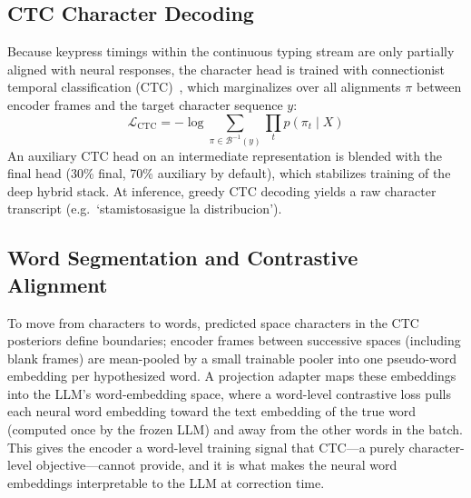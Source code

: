 \documentclass[conference]{IEEEtran}
\begin{document}
\subsection{CTC Character Decoding}
Because keypress timings within the continuous typing stream are only
partially aligned with neural responses, the character head is trained with
connectionist temporal classification (CTC)~\cite{graves2006ctc}, which
marginalizes over all alignments $\pi$ between encoder frames and the target
character sequence $y$:
\begin{equation}
\mathcal{L}_{\mathrm{CTC}} = -\log \sum_{\pi \in \mathcal{B}^{-1}(y)}
\prod_t p(\pi_t \mid X)
\end{equation}
An auxiliary CTC head on an intermediate representation is blended with the
final head (30\% final, 70\% auxiliary by default), which stabilizes
training of the deep hybrid stack. At inference, greedy CTC decoding yields
a raw character transcript (e.g.\ `stamistosasigue la distribucion').

\subsection{Word Segmentation and Contrastive Alignment}
To move from characters to words, predicted space characters in the CTC
posteriors define boundaries; encoder frames between successive spaces
(including blank frames) are mean-pooled by a small trainable pooler into
one pseudo-word embedding per hypothesized word. A projection adapter maps
these embeddings into the LLM's word-embedding space, where a word-level
contrastive loss pulls each neural word embedding toward the text embedding
of the true word (computed once by the frozen LLM) and away from the other
words in the batch. This gives the encoder a word-level training signal that
CTC---a purely character-level objective---cannot provide, and it is what
makes the neural word embeddings interpretable to the LLM at correction
time.
\end{document}

